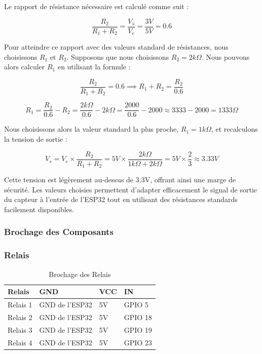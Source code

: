 Le rapport de résistance nécessaire est calculé comme suit :

\[
\frac{R_2}{R_1 + R_2} = \frac{V_{s}}{V_{e}} = \frac{3V}{5V} = 0.6
\]

Pour atteindre ce rapport avec des valeurs standard de résistances, nous choisissons \( R_1 \) et \( R_2 \). Supposons que nous choisissons \( R_2 = 2k\Omega \). Nous pouvons alors calculer \( R_1 \) en utilisant la formule :

\[
\frac{R_2}{R_1 + R_2} = 0.6 \implies R_1 + R_2 = \frac{R_2}{0.6}
\]

\[
R_1 = \frac{R_2}{0.6} - R_2 = \frac{2k\Omega}{0.6} - 2k\Omega = \frac{2000}{0.6} - 2000 \approx 3333 - 2000 = 1333 \Omega
\]

Nous choisissons alors la valeur standard la plus proche, \( R_1 = 1k\Omega \), et recalculons la tension de sortie :

\[
V_{s} = V_{e} \times \frac{R_2}{R_1 + R_2} = 5V \times \frac{2k\Omega}{1k\Omega + 2k\Omega} = 5V \times \frac{2}{3} \approx 3.33V
\]

Cette tension est légèrement au-dessus de 3.3V, offrant ainsi une marge de sécurité. Les valeurs choisies permettent d'adapter efficacement le signal de sortie du capteur à l'entrée de l'ESP32 tout en utilisant des résistances standards facilement disponibles.

\subsubsection{Brochage des Composants}
\subsubsection*{Relais}
\begin{table}[H]
	\centering
	\caption{Brochage des Relais}
	\begin{tabular}{|p{4.5cm}|p{3.5cm}|p{2cm}|p{3.5cm}|}
		\hline
		\rule[0.5cm]{0cm}{0cm} \textbf{Relais} & \textbf{GND} & \textbf{VCC} & \textbf{IN} \\
		\hline
		\rule[0.5cm]{0cm}{0cm} Relais 1 & GND de l'ESP32 & 5V & GPIO 5 \\
		\hline
		\rule[0.5cm]{0cm}{0cm} Relais 2 & GND de l'ESP32 & 5V & GPIO 18 \\
		\hline
		\rule[0.5cm]{0cm}{0cm} Relais 3 & GND de l'ESP32 & 5V & GPIO 19 \\
		\hline
		\rule[0.5cm]{0cm}{0cm} Relais 4 & GND de l'ESP32 & 5V & GPIO 23 \\
		\hline
	\end{tabular}
\end{table}

